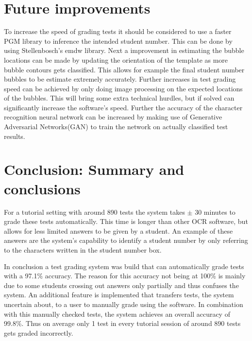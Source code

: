 \section{Future improvements}

To increase the speed of grading tests it should be considered to use a faster PGM library to inference the intended student number. This can be done by using Stellenbosch's emdw library. Next a improvement in estimating the bubble locations can be made by updating the orientation of the template as more bubble contours gets classified. This allows for example the final student number bubbles to be estimate extremely accurately. Further increases in test grading speed can be achieved by only doing image processing on the expected locations of the bubbles. This will bring some extra technical hurdles, but if solved can significantly increase the software's speed. Further the accuracy of the character recognition neural network can be increased by making use of Generative Adversarial Networks(GAN) to train the network on actually classified test results.

\section{Conclusion: Summary and conclusions}

For a tutorial setting with around 890 tests the system takes $\pm$ 30 minutes to grade these tests automatically. This time is longer than other OCR software, but allows for less limited answers to be given by a student. An example of these answers are the system's capability to identify a student number by only referring to the characters written in the student number box.

In conclusion a test grading system was build that can automatically grade tests with a 97.1\% accuracy. The reason for this accuracy not being at 100\% is mainly due to some students crossing out answers only partially and thus confuses the system. An additional feature is implemented that transfers tests, the system uncertain about, to a user to manually grade using the software. In combination with this manually checked tests, the system achieves an overall accuracy of 99.8\%. Thus on average only 1 test in every tutorial session of around 890 tests gets graded incorrectly.